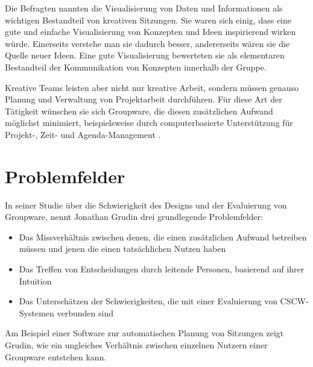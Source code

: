 Die Befragten nannten die Visualisierung von Daten und Informationen als wichtigen Bestandteil von kreativen Sitzungen. Sie waren sich einig, dass eine gute und einfache Visualisierung von Konzepten und Ideen inspirierend wirken würde. Einerseits verstehe man sie dadurch besser, andererseits wären sie die Quelle neuer Ideen. Eine gute Visualisierung bewerteten sie als elementaren Bestandteil der Kommunikation von Konzepten innerhalb der Gruppe.

Kreative Teams leisten aber nicht nur kreative Arbeit, sondern müssen genauso Planung und Verwaltung von Projektarbeit durchführen. Für diese Art der Tätigkeit wünschen sie sich Groupware, die diesen zusätzlichen Aufwand möglichst minimiert, beispielsweise durch computerbasierte Unterstützung für Projekt-, Zeit- und Agenda-Management \citep{Streitz:1998p198}.

\section{Problemfelder} 

In seiner Studie über die Schwierigkeit des Designs und der Evaluierung von Groupware, nennt Jonathan Grudin drei grundlegende Problemfelder:

\begin{itemize}
	\item
	Das Missverhältnis zwischen denen, die einen zusätzlichen Aufwand betreiben müssen und jenen die einen tatsächlichen Nutzen haben
	\item
	Das Treffen von Entscheidungen durch leitende Personen, basierend auf ihrer Intuition
	\item
	Das Unterschätzen der Schwierigkeiten, die mit einer Evaluierung von \ac{CSCW}-Systemen verbunden sind
\end{itemize}
\begin{flushright}
	\citep{Grudin:1988p126}
\end{flushright}

Am Beispiel einer Software zur automatischen Planung von Sitzungen zeigt Grudin, wie ein ungleiches Verhältnis zwischen einzelnen Nutzern einer Groupware entstehen kann. 

